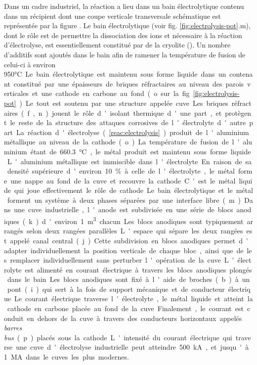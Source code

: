 Dans un cadre industriel, la réaction a lieu dans un bain
électrolytique contenu dans un récipient dont une coupe verticale
transversale schématique est représentée par la figure
. Le bain électrolytique (voir
fig. \ref{fig:electrolysis-pot}.m), dont le rôle est de permettre la
dissociation des ions  et  nécessaire à la
réaction d'électrolyse, est essentiellement constitué par de la
cryolite (). Un nombre d'additifs sont ajoutés dans le
bain afin de ramener la température de fusion de celui-ci à environ
\num{950}\si\celsius.

Le bain électrolytique est maintenu sous forme liquide dans un
contenant constitué par une épaisseurs de briques réfractaires au
niveau des parois verticales et une cathode en carbone au fond (o. sur
la fig. \ref{fig:electrolysis-pot}). Le tout est soutenu par une
structure appelée cuve. Les briques réfractaires (f., n.) jouent le rôle
d'isolant thermique d'une part, et protègent le reste de la structure
des attaques corrosives de l'électrolyte d'autre part.

La réaction d'électrolyse (\ref{reac:electrolysis}) produit de
l'aluminium métallique au niveau de la cathode (o.). La température de
fusion de l'aluminium étant de \num{660.3}\si{\celsius}, le métal
produit est maintenu sous forme liquide. L'aluminium métallique est
immiscible dans l'électrolyte. En raison de sa densité supérieure
d'environ \num{10}\% à celle de l'électrolyte, le métal forme une
nappe au fond de la cuve et recouvre la cathode. C'est le métal
liquide qui joue effectivement le rôle de cathode. Le bain
électrolytique et le métal forment un système à deux phases séparées
par une interface libre (m.).

Dans une cuve industrielle, l'anode est subdivisée en une série de
blocs anodiques (k.) d'environ \num{1} \si{\cubic\meter} chacun. Les blocs
anodiques sont typiquement arrangés selon deux rangées
parallèles. L'espace qui sépare les deux rangées est appelé canal
central (j.). Cette subdivision en blocs anodiques permet d'adapter
individuellement la position verticale de chaque bloc, ainsi que de
les remplacer individuellement sans perturber l'opération de la cuve.

L'électrolyte est alimenté en courant électrique à travers les blocs
anodiques plongés dans le bain. Les blocs anodiques sont fixé à l'aide
de broches (b.) à un pont (i.) qui sert à la fois de support mécanique
et de conducteur électrique. Le courant électrique traverse
l'électrolyte, le métal liquide et atteint la cathode en carbone
placée au fond de la cuve. Finalement, le courant est conduit en
dehors de la cuve à travers des conducteurs horizontaux appelés {\em
  barres bus} (p.) placés sous la cathode. L'intensité du courant
électrique qui traverse une cuve d'électrolyse industrielle peut
atteindre \num{500}\si{\kilo\ampere}, et jusqu'à
\num{1}\si{\mega\ampere} dans le cuves les plus modernes.

